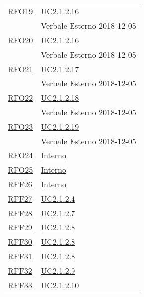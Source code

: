 \begin{longtable}{|>{\centering}m{5cm}|m{5cm}<{\centering}|}
	\hyperlink{RFO19}{RFO19} & \hyperref[UC2.1.2.16]{UC2.1.2.16} \\& Verbale Esterno 2018-12-05\\ \hline
	
	\hyperlink{RFO20}{RFO20} & \hyperref[UC2.1.2.16]{UC2.1.2.16} \\& Verbale Esterno 2018-12-05\\ \hline
	
	\hyperlink{RFO21}{RFO21} & \hyperref[UC2.1.2.17]{UC2.1.2.17} \\& Verbale Esterno 2018-12-05\\ \hline
	
	\hyperlink{RFO22}{RFO22} & \hyperref[UC2.1.2.18]{UC2.1.2.18} \\& Verbale Esterno 2018-12-05\\ \hline
	
	\hyperlink{RFO23}{RFO23} & \hyperref[UC2.1.2.19]{UC2.1.2.19} \\& Verbale Esterno 2018-12-05\\ \hline
	
	\hyperlink{RFO24}{RFO24} & \hyperref[Interno]{Interno}\\ \hline
	
	\hyperlink{RFO25}{RFO25} & \hyperref[Interno]{Interno}\\ \hline
	
	\hyperlink{RFF26}{RFF26} & \hyperref[Interno]{Interno}\\ \hline
	
	\hyperlink{RFF27}{RFF27} & \hyperref[UC2.1.2.4]{UC2.1.2.4}\\ \hline
	
	\hyperlink{RFF28}{RFF28} & \hyperref[UC2.1.2.7]{UC2.1.2.7}\\ \hline
	
	\hyperlink{RFF29}{RFF29} & \hyperref[UC2.1.2.8]{UC2.1.2.8}\\ \hline
	
	\hyperlink{RFF30}{RFF30} & \hyperref[UC2.1.2.8]{UC2.1.2.8}\\ \hline
	
	\hyperlink{RFF31}{RFF31} & \hyperref[UC2.1.2.8]{UC2.1.2.8}\\ \hline
	
	\hyperlink{RFF32}{RFF32} & \hyperref[UC2.1.2.9]{UC2.1.2.9}\\ \hline
	
	\hyperlink{RFF33}{RFF33} & \hyperref[UC2.1.2.10]{UC2.1.2.10}\\ \hline
	

\end{longtable}
